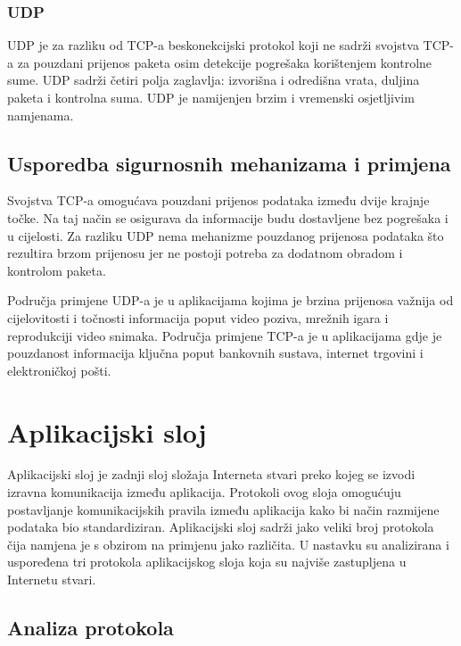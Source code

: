 \documentclass[times, utf8, diplomski]{fer}
\begin{document}
\subsubsection{UDP}
UDP je za razliku od TCP-a beskonekcijski protokol koji ne sadrži svojstva TCP-a za pouzdani prijenos paketa osim detekcije pogrešaka korištenjem kontrolne sume. UDP sadrži četiri polja zaglavlja: izvorišna i odredišna vrata, duljina paketa i kontrolna suma. UDP je namijenjen brzim i vremenski osjetljivim namjenama.

\subsection{Usporedba sigurnosnih mehanizama i primjena}
Svojstva TCP-a omogućava pouzdani prijenos podataka između dvije krajnje točke. Na taj način se osigurava da informacije budu dostavljene bez pogrešaka i u cijelosti. Za razliku UDP nema mehanizme pouzdanog prijenosa podataka što rezultira brzom prijenosu jer ne postoji potreba za dodatnom obradom i kontrolom paketa. 

Područja primjene UDP-a je u aplikacijama kojima je brzina prijenosa važnija od cijelovitosti i točnosti informacija poput video poziva, mrežnih igara i reprodukciji video snimaka. Područja primjene TCP-a je u aplikacijama gdje je pouzdanost informacija ključna poput bankovnih sustava, internet trgovini i elektroničkoj pošti.

\section{Aplikacijski sloj}
Aplikacijski sloj je zadnji sloj složaja Interneta stvari preko kojeg se izvodi izravna komunikacija između aplikacija. Protokoli ovog sloja omogućuju postavljanje komunikacijskih pravila između aplikacija kako bi način razmijene podataka bio standardiziran. Aplikacijski sloj sadrži jako veliki broj protokola čija namjena je s obzirom na primjenu jako različita. U nastavku su analizirana i uspoređena tri protokola aplikacijskog sloja koja su najviše zastupljena u Internetu stvari.

\subsection{Analiza protokola}
\end{document}
